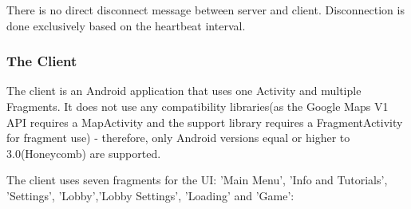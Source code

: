 There is no direct disconnect message between server and client. Disconnection
is done exclusively based on the heartbeat interval.\newline

\subsubsection{The Client}

The client is an Android application that uses one Activity and multiple
Fragments. It does not use any compatibility libraries(as the Google Maps V1 API
requires a MapActivity and the support library requires a FragmentActivity for
fragment use) - therefore, only Android versions equal or higher to
3.0(Honeycomb) are supported. 

The client uses seven fragments for the UI: 'Main Menu', 'Info and
Tutorials', 'Settings', 'Lobby','Lobby Settings', 'Loading' and 'Game':

